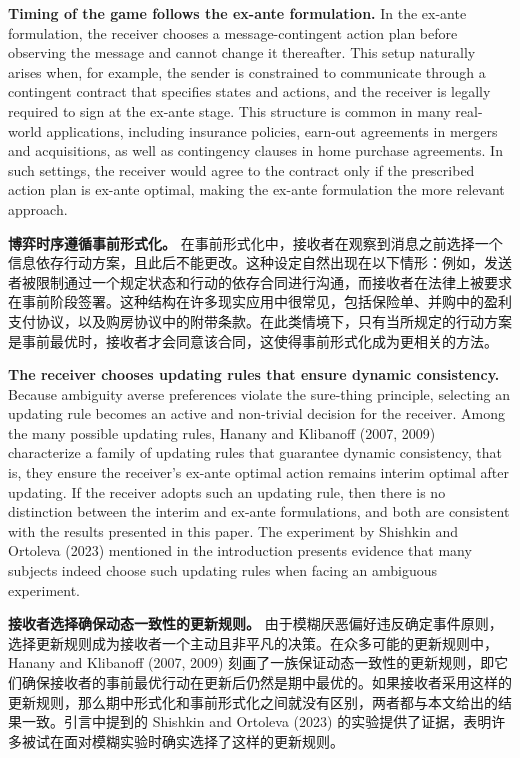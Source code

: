 \documentclass[12pt,a4paper]{article}
\theoremstyle{definition}
\theoremstyle{remark}
\newenvironment{original}{%
    \par\medskip\noindent%
    \begin{tcolorbox}[%
        colback=white,%
        colframe=black!50,%
        title=\textbf{Original English},%
        fonttitle=\small\bfseries,%
        left=0pt, right=0pt, top=2pt, bottom=2pt,%
        boxrule=0.5pt,%
        arc=0pt,%
        outer arc=0pt%
    ]%
    \small%
}{%
    \end{tcolorbox}%
}
\newenvironment{translation}{%
    \par\smallskip\noindent%
    \begin{tcolorbox}[%
        colback=blue!3!white,%
        colframe=blue!40!black,%
        title=\textbf{中文翻译},%
        fonttitle=\small\bfseries,%
        left=0pt, right=0pt, top=2pt, bottom=2pt,%
        boxrule=0.5pt,%
        arc=0pt,%
        outer arc=0pt%
    ]%
    \small\color{blue!60!black}%
}{%
    \end{tcolorbox}\medskip%
}
\begin{document}
\begin{original}
\textbf{Timing of the game follows the ex-ante formulation.} In the ex-ante formulation, the receiver chooses a message-contingent action plan before observing the message and cannot change it thereafter. This setup naturally arises when, for example, the sender is constrained to communicate through a contingent contract that specifies states and actions, and the receiver is legally required to sign at the ex-ante stage. This structure is common in many real-world applications, including insurance policies, earn-out agreements in mergers and acquisitions, as well as contingency clauses in home purchase agreements. In such settings, the receiver would agree to the contract only if the prescribed action plan is ex-ante optimal, making the ex-ante formulation the more relevant approach.
\end{original}
\begin{translation}
\textbf{博弈时序遵循事前形式化。} 在事前形式化中，接收者在观察到消息之前选择一个信息依存行动方案，且此后不能更改。这种设定自然出现在以下情形：例如，发送者被限制通过一个规定状态和行动的依存合同进行沟通，而接收者在法律上被要求在事前阶段签署。这种结构在许多现实应用中很常见，包括保险单、并购中的盈利支付协议，以及购房协议中的附带条款。在此类情境下，只有当所规定的行动方案是事前最优时，接收者才会同意该合同，这使得事前形式化成为更相关的方法。
\end{translation}

\begin{original}
\textbf{The receiver chooses updating rules that ensure dynamic consistency.} Because ambiguity averse preferences violate the sure-thing principle, selecting an updating rule becomes an active and non-trivial decision for the receiver. Among the many possible updating rules, Hanany and Klibanoff (2007, 2009) characterize a family of updating rules that guarantee dynamic consistency, that is, they ensure the receiver's ex-ante optimal action remains interim optimal after updating. If the receiver adopts such an updating rule, then there is no distinction between the interim and ex-ante formulations, and both are consistent with the results presented in this paper. The experiment by Shishkin and Ortoleva (2023) mentioned in the introduction presents evidence that many subjects indeed choose such updating rules when facing an ambiguous experiment.
\end{original}
\begin{translation}
\textbf{接收者选择确保动态一致性的更新规则。} 由于模糊厌恶偏好违反确定事件原则，选择更新规则成为接收者一个主动且非平凡的决策。在众多可能的更新规则中，Hanany and Klibanoff (2007, 2009) 刻画了一族保证动态一致性的更新规则，即它们确保接收者的事前最优行动在更新后仍然是期中最优的。如果接收者采用这样的更新规则，那么期中形式化和事前形式化之间就没有区别，两者都与本文给出的结果一致。引言中提到的 Shishkin and Ortoleva (2023) 的实验提供了证据，表明许多被试在面对模糊实验时确实选择了这样的更新规则。
\end{translation}
\end{document}
